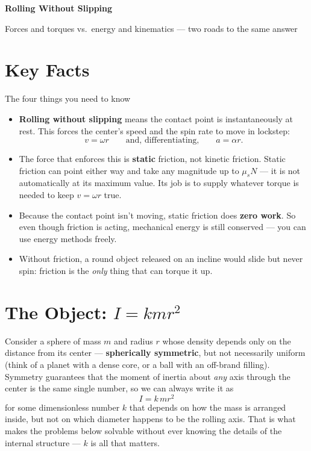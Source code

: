 \documentclass[11pt]{article}
\newcommand{\psettitle}[1]{
    \begin{center}
    \huge \textbf{#1}
    \end{center}
}
\begin{document}
\psettitle{Rolling Without Slipping}
\begin{center}
\large Forces and torques vs.\ energy and kinematics --- two roads to the same answer
\end{center}

\section*{Key Facts}

\begin{psidea}{The four things you need to know}{}
\begin{itemize}
\item \textbf{Rolling without slipping} means the contact point is instantaneously at
rest. This forces the center's speed and the spin rate to move in lockstep:
\[
v = \omega r \qquad\text{and, differentiating,}\qquad a = \alpha r.
\]
\item The force that enforces this is \textbf{static} friction, not kinetic friction.
Static friction can point either way and take any magnitude up to $\mu_s N$ --- it is
not automatically at its maximum value. Its job is to supply whatever torque is needed
to keep $v = \omega r$ true.
\item Because the contact point isn't moving, static friction does \textbf{zero work}.
So even though friction is acting, mechanical energy is still conserved --- you can use
energy methods freely.
\item Without friction, a round object released on an incline would slide but never
spin: friction is the \emph{only} thing that can torque it up.
\end{itemize}
\end{psidea}

\section*{The Object: $I = kmr^2$}

Consider a sphere of mass $m$ and radius $r$ whose density depends only on the distance
from its center --- \textbf{spherically symmetric}, but not necessarily uniform (think of
a planet with a dense core, or a ball with an off-brand filling). Symmetry guarantees
that the moment of inertia about \emph{any} axis through the center is the same single
number, so we can always write it as
\[
\boxed{\,I = k\,m r^2\,}
\]
for some dimensionless number $k$ that depends on how the mass is arranged inside,
but not on which diameter happens to be the rolling axis. That is what makes the
problems below solvable without ever knowing the details of the internal structure ---
$k$ is all that matters.
\end{document}

